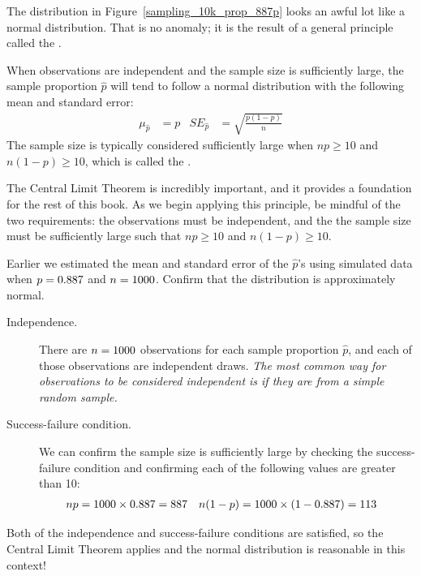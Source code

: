 The distribution in
Figure~\ref{sampling_10k_prop_887p} looks an awful lot like
a normal distribution. That is no anomaly; it is the result
of a general principle called the .

\begin{termBox}{
When observations are independent and the sample size is
sufficiently large, the sample proportion $\hat{p}$ will tend
to follow a normal distribution with the following mean and
standard error:
\begin{align*}
  \mu_{\hat{p}} &= p
  &SE_{\hat{p}} &= \sqrt{\frac{p (1 - p)}{n}}
\end{align*}
The sample size is typically considered sufficiently large when
$np \geq 10$ and $n(1-p) \geq 10$, which is called the
.} %
\end{termBox}

The Central Limit Theorem is incredibly important, and it provides
a foundation for the rest of this book. As we begin applying
this principle, be mindful of the two requirements:
the observations must be independent, and the the sample size must
be sufficiently large such that $np \geq 10$ and $n(1-p) \geq 10$.

\begin{example}{Earlier we estimated the mean and standard
error of the $\hat{p}$'s using simulated data when
$p = 0.887{}$ and $n = 1000{}$.
Confirm that the distribution is approximately
normal.}\label{sample_p887_n1000_confirm_normal}
\begin{description}
\item[Independence.] There are $n = 1000{}$
    observations for each
    sample proportion $\hat{p}$, and each of those observations
    are independent draws. \emph{The most common way for
    observations to be considered independent is if they are from
    a simple random sample.}
\item[Success-failure condition.] We can confirm the sample size
    is sufficiently large by checking the success-failure condition
    and confirming each of the following values are greater than 10:
    \begin{align*}
    np &= 1000{} \times 0.887{}
        = 887{}
    &n(1-p) &= 1000{} \times (1 - 0.887{})
        = 113{}
    \end{align*}
\end{description}
Both of the independence and success-failure conditions are
satisfied, so the Central Limit Theorem applies and the normal
distribution is reasonable in this context!
\end{example}

